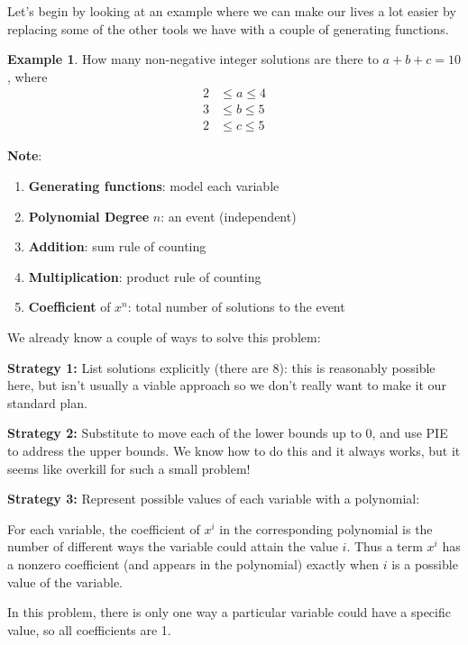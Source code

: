 \documentclass{article}
\theoremstyle{definition}
\newtheorem{example}{Example}
\begin{document}
Let's begin by looking at an example where we can make our lives a lot easier by replacing some of the other tools we have with a couple of generating functions.

\begin{example}
How many non-negative integer solutions are there to $a+b+c=10$, where
\begin{align}
2 &\leq a \leq 4 \\
3 &\leq b \leq 5 \\
2 &\leq c \leq 5
\end{align}
\end{example}





\textbf{Note}:
\begin{enumerate}
  \item \textbf{Generating functions}: model each variable
  \item \textbf{Polynomial Degree} $n$: an event (independent)
  \item \textbf{Addition}: sum rule of counting
  \item \textbf{Multiplication}: product rule of counting
  \item \textbf{Coefficient} of $x^{n}$: total number of solutions to the event
\end{enumerate}



We already know a couple of ways to solve this problem:

\textbf{Strategy 1:} List solutions explicitly (there are 8): this is reasonably possible here, but isn't usually a viable approach so we don't really want to make it our standard plan.

\textbf{Strategy 2:} Substitute to move each of the lower bounds up to 0, and use PIE to address the upper bounds. We know how to do this and it always works, but it seems like overkill for such a small problem!

\textbf{Strategy 3:} Represent possible values of each variable with a polynomial:

For each variable, the coefficient of $x^{i}$ in the corresponding polynomial is the number of different ways the variable could attain the value $i$. Thus a term $x^{i}$ has a nonzero coefficient (and appears in the polynomial) exactly when $i$ is a possible value of the variable.

In this problem, there is only one way a particular variable could have a specific value, so all coefficients are 1.
\end{document}
